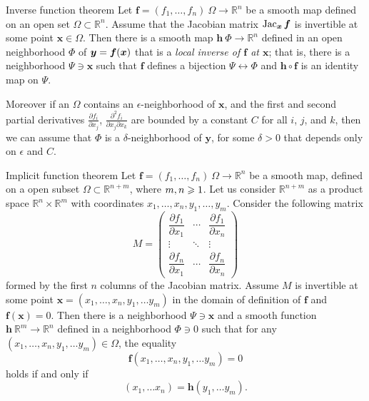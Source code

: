 \begin{thm}{Inverse function theorem}\label{thm:inverse}
Let $\bm{f}=(f_1,\dots,f_n)\:\Omega\to\mathbb{R}^n$ be a smooth map
defined on an open set $\Omega\subset \mathbb{R}^n$.
Assume that the Jacobian matrix
$\mathop{\rm Jac}\nolimits_{\bm{x}}\bm{f}$
is invertible at some point $\bm{x}\in \Omega$.
Then there is a smooth map $\bm{h}\:\Phi\to\mathbb{R}^n$ defined in an open neighborhood $\Phi$ of ${\bm{y}}\z=\bm{f}(\bm{x})$ that is a {}\emph{local inverse of $\bm{f}$ at $\bm{x}$};
that is, there is a neighborhood $\Psi\ni \bm{x}$ such that
$\bm{f}$ defines a bijection $\Psi\leftrightarrow \Phi$ and
$\bm{h} \circ \bm{f}$ is an identity map on $\Psi$.

Moreover if an $\Omega$ contains an $\epsilon$-neighborhood of $\bm{x}$, and the first and second partial derivatives $\tfrac{\partial f_i}{\partial x_j}$, $\tfrac{\partial^2 f_i}{\partial x_j\partial x_k}$ are bounded by a constant $C$ for all $i$, $j$, and $k$, then we can assume that $\Phi$ is a $\delta$-neighborhood of $\bm{y}$, for some $\delta>0$ that depends only on $\epsilon$ and $C$. 
\end{thm}

\begin{thm}{Implicit function theorem}\label{thm:imlicit}
Let $\bm{f}=(f_1,\dots,f_n)\:\Omega\to\mathbb{R}^n$ be a smooth map, defined on a open subset $\Omega\subset\mathbb{R}^{n+m}$, where
$m,n\z\ge 1$.
Let us consider $\mathbb{R}^{n+m}$ as a product space $\mathbb{R}^n\times \mathbb{R}^m$ with coordinates 
$x_1,\dots,x_n,y_1,\dots,y_m$.
Consider the following matrix 
\[
M=\begin{pmatrix}
\dfrac{\partial f_1}{\partial x_1} & \cdots & \dfrac{\partial f_1}{\partial x_n}\\
\vdots & \ddots & \vdots\\
\dfrac{\partial f_n}{\partial x_1} & \cdots & \dfrac{\partial f_n}{\partial x_n} \end{pmatrix}\]
formed by the first $n$ columns of the Jacobian matrix.
Assume $M$ is invertible at some point $\bm{x}=(x_1,\dots,x_n,y_1,\dots y_m)$ in the domain of definition of $\bm{f}$ and $\bm{f}(\bm{x})=0$.
Then there is a neighborhood $\Psi\ni \bm{x}$
and a smooth function $\bm{h}\:\mathbb{R}^m\to\mathbb{R}^n$ defined in a neighborhood $\Phi\ni 0$ such that
for any $(x_1,\dots,x_n,y_1,\dots y_m)\in \Omega$, the equality
\[\bm{f}(x_1,\dots,x_n,y_1,\dots y_m)=0\]
holds if and only if 
\[(x_1,\dots x_n)=\bm{h}(y_1,\dots y_m).\]

\end{thm}

